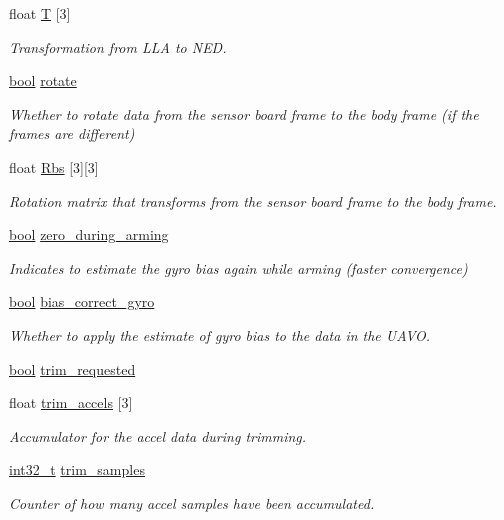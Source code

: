 \begin{DoxyCompactItemize}
float \hyperlink{group___state_ga45b3fda0427f0fab27b88df83ae9108d}{T} \mbox{[}3\mbox{]}
\begin{DoxyCompactList}\small\item\em Transformation from L\-L\-A to N\-E\-D. \end{DoxyCompactList}\item 
\hyperlink{group___exported__types_gaf6a258d8f3ee5206d682d799316314b1}{bool} \hyperlink{group___state_gad5da7bf77c18e9d5990d4b6d6f28477e}{rotate}
\begin{DoxyCompactList}\small\item\em Whether to rotate data from the sensor board frame to the body frame (if the frames are different) \end{DoxyCompactList}\item 
float \hyperlink{group___state_ga6c34048525801ac0e7e26eb733c759d5}{Rbs} \mbox{[}3\mbox{]}\mbox{[}3\mbox{]}
\begin{DoxyCompactList}\small\item\em Rotation matrix that transforms from the sensor board frame to the body frame. \end{DoxyCompactList}\item 
\hyperlink{group___exported__types_gaf6a258d8f3ee5206d682d799316314b1}{bool} \hyperlink{group___state_gaa625401f5bc69c19b54b3171703f37f9}{zero\-\_\-during\-\_\-arming}
\begin{DoxyCompactList}\small\item\em Indicates to estimate the gyro bias again while arming (faster convergence) \end{DoxyCompactList}\item 
\hyperlink{group___exported__types_gaf6a258d8f3ee5206d682d799316314b1}{bool} \hyperlink{group___state_ga3df4e05bd900b439ad746cbadce667d5}{bias\-\_\-correct\-\_\-gyro}
\begin{DoxyCompactList}\small\item\em Whether to apply the estimate of gyro bias to the data in the U\-A\-V\-O. \end{DoxyCompactList}\item 
\hyperlink{group___exported__types_gaf6a258d8f3ee5206d682d799316314b1}{bool} \hyperlink{group___state_ga1b90881e0b0eb5aa9cf39d0ba8ef5e0d}{trim\-\_\-requested}
\item 
float \hyperlink{group___state_ga8941c16a263cb020587ef58dd38f8281}{trim\-\_\-accels} \mbox{[}3\mbox{]}
\begin{DoxyCompactList}\small\item\em Accumulator for the accel data during trimming. \end{DoxyCompactList}\item 
\hyperlink{group___n_a_m_e_gafd12020da5a235dfcf0c3c748fb5baed}{int32\-\_\-t} \hyperlink{group___state_ga9e5b2790cd84db83278b3c8c289ea411}{trim\-\_\-samples}
\begin{DoxyCompactList}\small\item\em Counter of how many accel samples have been accumulated. \end{DoxyCompactList}\end{DoxyCompactItemize}


